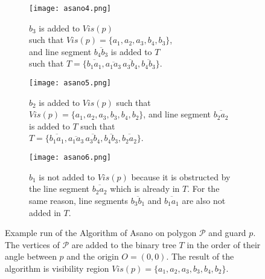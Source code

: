 \begin{figure}[h!]
	\ContinuedFloat
	\centering
	\begin{subfigure}{0.45\linewidth}
		\texttt{[image: asano4.png]}
		\caption{$b_3$ is added to $Vis(p)$ \\ such that $Vis(p)=\{a_1, a_2, a_3, b_4, b_3\}$, \\ and line segment $\overline{b_4b_3}$ is added to $T$ \\ such that $T = \{\overline{b_1a_1}, \overline{a_1a_3}\, \overline{a_3b_4}, \overline{b_4b_3}\}$.}
	\end{subfigure}
	\begin{subfigure}{0.45\linewidth}
		\texttt{[image: asano5.png]}
		\caption{$b_2$ is added to $Vis(p)$ such that \\ $Vis(p) = \{a_1, a_2, a_3, b_3, b_4, b_2\}$, and line segment $\overline{b_2a_2}$ is added to $T$ such that \\ $T = \{\overline{b_1a_1}, \overline{a_1a_3}\, \overline{a_3b_4}, \overline{b_4b_3}, \overline{b_2a_2}\}$.}
	\end{subfigure}

	\begin{subfigure}{\linewidth}
		\centering
		\texttt{[image: asano6.png]}
		\caption{$b_1$ is not added to $Vis(p)$ because it is obstructed by the line segment $\overline{b_2a_2}$ which is already in $T$. For the same reason, line segments $\overline{b_3b_1}$ and $\overline{b_1a_1}$ are also not added in $T$.}
		\label{fig:asano7}
	\end{subfigure}
	\caption{Example run of the Algorithm of Asano \cite{asano1985efficient} on polygon $\mathcal P$ and guard $p$. The vertices of $\mathcal P$ are added to the binary tree $T$ in the order of their angle between $p$ and the origin $O = (0, 0)$. The result of the algorithm is visibility region $Vis(p) = \{a_1, a_2, a_3, b_3, b_4, b_2\}$.}
	\label{fig:asano}
\end{figure}



\newpage 
